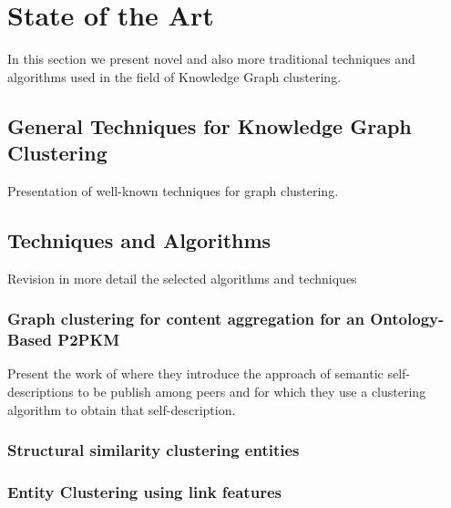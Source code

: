 \documentclass[runningheads]{llncs}
\begin{document}
\section{State of the Art}\label{state-art}
In this section we present novel and also more traditional techniques and algorithms used in the field of Knowledge Graph clustering. 


\subsection{General Techniques for Knowledge Graph Clustering} \label{general-techniques}
Presentation of well-known techniques for graph clustering.


\subsection{Techniques and Algorithms}\label{algorithms}
Revision in more detail the selected algorithms and techniques 


\subsubsection{Graph clustering for content aggregation for an Ontology-Based P2PKM}\label{content-aggregation}
Present the work of \cite{Schmitz} where they introduce the approach of semantic self-descriptions to be publish among peers and for which they use a clustering algorithm to obtain that self-description.


\subsubsection{Structural similarity clustering entities} \label{structural-similarity}


\subsubsection{Entity Clustering using link features} \label{entity-clustering}
\end{document}

